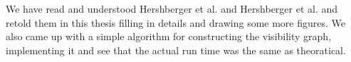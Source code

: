 We have read and understood Hershberger et al. \cite{HershbergerS99} and
Hershberger et al. \cite{HershbergerKS17} and retold them in this thesis
filling in details and drawing some more figures. We also came up with a simple
algorithm for constructing the visibility graph, implementing it and see that
the actual run time was the same as theoratical.
